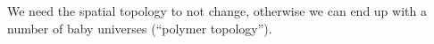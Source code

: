 \lecture

We need the spatial topology to not change, otherwise we can end up with
a number of baby universes (``polymer topology'').
